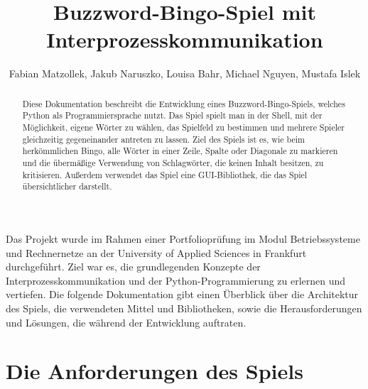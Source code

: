 \documentclass{llncs}
\begin{document}
%
%
%
\mainmatter              %

\title{Buzzword-Bingo-Spiel mit Interprozesskommunikation}
%
\author{Fabian Matzollek, Jakub Naruszko, Louisa Bahr, Michael Nguyen, Mustafa Islek}
%

\maketitle              %

\begin{abstract}
Diese Dokumentation beschreibt die Entwicklung eines Buzzword-Bingo-Spiels, welches Python als Programmiersprache nutzt. Das Spiel spielt man in der Shell, mit der Möglichkeit, eigene Wörter zu wählen, das Spielfeld zu bestimmen und mehrere Spieler gleichzeitig gegeneinander antreten zu lassen. Ziel des Spiels ist es, wie beim herkömmlichen Bingo, alle Wörter in einer Zeile, Spalte oder Diagonale zu markieren und die übermäßige Verwendung von Schlagwörter, die keinen Inhalt besitzen, zu kritisieren. Außerdem verwendet das Spiel eine GUI-Bibliothek, die das Spiel übersichtlicher darstellt.

 
\end{abstract}

Das Projekt wurde im Rahmen einer Portfolioprüfung im Modul Betriebssysteme und Rechnernetze an der University of Applied Sciences in Frankfurt durchgeführt. Ziel war es, die grundlegenden Konzepte der Interprozesskommunikation und der Python-Programmierung zu erlernen und vertiefen. Die folgende Dokumentation gibt einen Überblick über die Architektur des Spiels, die verwendeten Mittel und Bibliotheken, sowie die Herausforderungen und Lösungen, die während der Entwicklung auftraten. 

\section{Die Anforderungen des Spiels}
\end{document}
